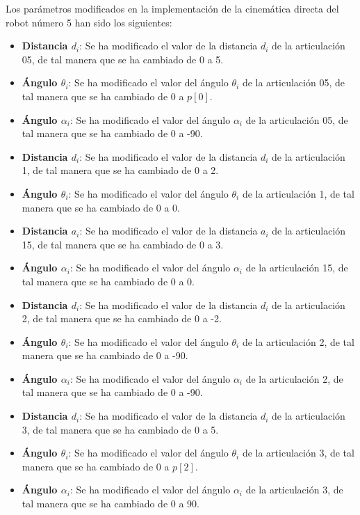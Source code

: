 \documentclass[11pt]{report}
\begin{document}
Los parámetros modificados en la implementación de la cinemática directa del robot número 5 han sido los siguientes:

\begin{itemize}
    \item \textbf{Distancia $d_i$}: Se ha modificado el valor de la distancia $d_i$ de la articulación 05, de tal manera que se ha cambiado de 0 a 5.
    \item \textbf{Ángulo $\theta_i$}: Se ha modificado el valor del ángulo $\theta_i$ de la articulación 05, de tal manera que se ha cambiado de 0 a $p[0]$.
    \item \textbf{Ángulo $\alpha_i$}: Se ha modificado el valor del ángulo $\alpha_i$ de la articulación 05, de tal manera que se ha cambiado de 0 a -90.
    \item \textbf{Distancia $d_i$}: Se ha modificado el valor de la distancia $d_i$ de la articulación 1, de tal manera que se ha cambiado de 0 a 2.
    \item \textbf{Ángulo $\theta_i$}: Se ha modificado el valor del ángulo $\theta_i$ de la articulación 1, de tal manera que se ha cambiado de 0 a 0.
    \item \textbf{Distancia $a_i$}: Se ha modificado el valor de la distancia $a_i$ de la articulación 15, de tal manera que se ha cambiado de 0 a 3.
    \item \textbf{Ángulo $\alpha_i$}: Se ha modificado el valor del ángulo $\alpha_i$ de la articulación 15, de tal manera que se ha cambiado de 0 a 0.
    \item \textbf{Distancia $d_i$}: Se ha modificado el valor de la distancia $d_i$ de la articulación 2, de tal manera que se ha cambiado de 0 a -2.
    \item \textbf{Ángulo $\theta_i$}: Se ha modificado el valor del ángulo $\theta_i$ de la articulación 2, de tal manera que se ha cambiado de 0 a -90.
    \item \textbf{Ángulo $\alpha_i$}: Se ha modificado el valor del ángulo $\alpha_i$ de la articulación 2, de tal manera que se ha cambiado de 0 a -90.
    \item \textbf{Distancia $d_i$}: Se ha modificado el valor de la distancia $d_i$ de la articulación 3, de tal manera que se ha cambiado de 0 a 5.
    \item \textbf{Ángulo $\theta_i$}: Se ha modificado el valor del ángulo $\theta_i$ de la articulación 3, de tal manera que se ha cambiado de 0 a $p[2]$.
    \item \textbf{Ángulo $\alpha_i$}: Se ha modificado el valor del ángulo $\alpha_i$ de la articulación 3, de tal manera que se ha cambiado de 0 a 90.

\end{itemize}
\end{document}
